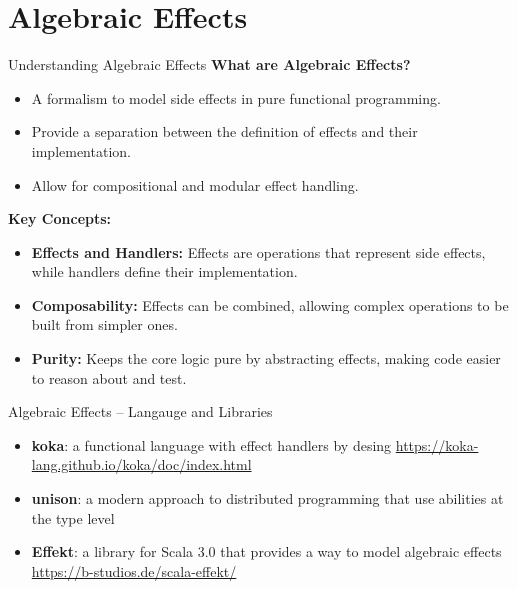 \documentclass[presentation, 10pt]{beamer}\mode<presentation>{\usetheme{AMSBolognaFC}}
\begin{document}
\section{Algebraic Effects}
\begin{frame}{Understanding Algebraic Effects}
	\textbf{What are Algebraic Effects?}
	\begin{itemize}
			\item A formalism to model side effects in pure functional programming.
			\item Provide a separation between the definition of effects and their implementation.
			\item Allow for compositional and modular effect handling.
	\end{itemize}

	\textbf{Key Concepts:}
	\begin{itemize}
			\item \textbf{Effects and Handlers:} Effects are operations that represent side effects, while handlers define their implementation.
			\item \textbf{Composability:} Effects can be combined, allowing complex operations to be built from simpler ones.
			\item \textbf{Purity:} Keeps the core logic pure by abstracting effects, making code easier to reason about and test.
	\end{itemize}
\end{frame}
\begin{frame}{Algebraic Effects -- Langauge and Libraries}
\begin{itemize}
	\item \textbf{koka}: a functional language with effect handlers by desing \url{https://koka-lang.github.io/koka/doc/index.html}
	\item \textbf{unison}: a modern approach to distributed programming that use abilities at the type level
	\item \textbf{Effekt}: a library for Scala 3.0 that provides a way to model algebraic effects \url{https://b-studios.de/scala-effekt/}
\end{itemize}
\end{frame}
\end{document}
